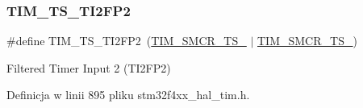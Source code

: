 \mbox{\label{group___t_i_m___trigger___selection_ga0ed58a269bccd3f22d19cc9a2ba3123f}} 
\subsubsection{\texorpdfstring{T\+I\+M\+\_\+\+T\+S\+\_\+\+T\+I2\+F\+P2}{TIM\_TS\_TI2FP2}}
{\footnotesize\ttfamily \#define T\+I\+M\+\_\+\+T\+S\+\_\+\+T\+I2\+F\+P2~(\hyperlink{group___peripheral___registers___bits___definition_gacb82212fcc89166a43ff97542da9182d}{T\+I\+M\+\_\+\+S\+M\+C\+R\+\_\+\+T\+S\+\_} $\vert$ \hyperlink{group___peripheral___registers___bits___definition_gacf0dbaf4a2ec8759f283f82a958ef6a8}{T\+I\+M\+\_\+\+S\+M\+C\+R\+\_\+\+T\+S\+\_})}

Filtered Timer Input 2 (T\+I2\+F\+P2) 

Definicja w linii 895 pliku stm32f4xx\+\_\+hal\+\_\+tim.\+h.

